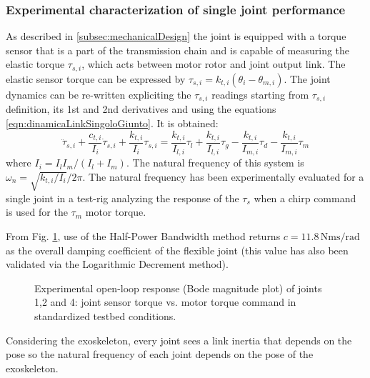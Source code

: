 \subsubsection{Experimental characterization of single joint performance}
As described in \ref{subsec:mechanicalDesign} the joint is equipped with a torque sensor that is a part of the transmission chain and is capable of measuring the elastic torque $\tau_{s,i}$, which acts between motor rotor and joint output link. The elastic sensor torque can be expressed by $\tau_{s,i} = k_{t,i} (\theta_{i}-\theta_{m,i})$. The joint dynamics can be re-written expliciting the $\tau_{s,i}$ readings starting from  $\tau_{s,i}$ definition, its 1st and 2nd derivatives and using the equations  \ref{eqn:dinamicaLinkSingoloGiunto}. It is obtained:
\begin{equation}
\label{eqn:dinamicaSensoreCoppia}
\ddot{\tau}_{s,i} + \frac{c_{t,i}}{I_i}\dot{\tau}_{s,i} + \frac{k_{t,i}}{I_i}\tau_{s,i}= \frac{k_{t,i}}{I_{l,i}}\tau_l + \frac{k_{t,i}}{I_{l,i}}\tau_g - \frac{k_{t,i}}{I_{m,i}}\tau_d - \frac{k_{t,i}}{I_{m,i}}\tau_m
\end{equation}
where $I_i = I_l I_m /(I_l+I_m)$. The natural frequency of this system is $\omega_n = \sqrt{k_{t,i} /I_i } /2\pi$. The natural frequency has been experimentally evaluated for a single joint in a test-rig analyzing the response of the $\tau_s$ when a chirp command is used for the $\tau_m$ motor torque. 
\par From Fig. \ref{fig:OpenLoopJointBode}, use of the Half-Power Bandwidth method returns $c = 11.8 \, \text{Nms/rad}$ as the overall damping coefficient of the flexible joint (this value has also been validated via the Logarithmic Decrement method).
\begin{figure}[ht]
	\centering
	\def\svgwidth{1\columnwidth}
	\begin{footnotesize}
		
	\end{footnotesize}
	\caption{Experimental open-loop response (Bode magnitude plot) of joints 1,2 and 4: joint sensor torque vs. motor torque command in standardized testbed conditions.}
	\label{fig:OpenLoopJointBode}
\end{figure}
Considering the exoskeleton, every joint sees a link inertia that depends on the pose so the natural frequency of each joint depends on the pose of the exoskeleton. 
